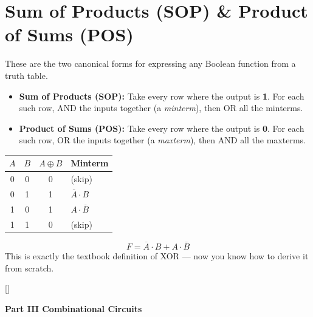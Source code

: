 \documentclass[11pt, letterpaper]{article}
\newcommand{\tealsections}{%
  \titleformat{\section}{\large\bfseries\color{sectionteal}}{}{0em}{}[\color{sectionteal}\titlerule]%
  \titleformat{\subsection}{\normalsize\bfseries\color{sectionteal!80!black}}{}{0em}{}%
}
\newcommand{\partbanner}[3]{%
  \begin{tcolorbox}[colback=#1, colframe=#2, boxrule=1.2pt, arc=4pt,
    left=8pt, right=8pt, top=6pt, bottom=6pt]
    \begin{center}{\LARGE\bfseries #3}\end{center}
  \end{tcolorbox}%
}
\begin{document}
\section*{Sum of Products (SOP) \& Product of Sums (POS)}

These are the two canonical forms for expressing any Boolean function from a truth table.

\begin{itemize}[noitemsep]
  \item \textbf{Sum of Products (SOP):} Take every row where the output is \textbf{1}. For each such row, AND the inputs together (a \emph{minterm}), then OR all the minterms.
  \item \textbf{Product of Sums (POS):} Take every row where the output is \textbf{0}. For each such row, OR the inputs together (a \emph{maxterm}), then AND all the maxterms.
\end{itemize}

\begin{tcolorbox}[colback=part4bg, colframe=sectionorange,
  title={\bfseries Example: Build an SOP expression for XOR from a truth table}, arc=3pt, boxrule=1pt]
\begin{center}
\renewcommand{\arraystretch}{1.3}
\begin{tabular}{cc|c|l}
$A$ & $B$ & $A \oplus B$ & Minterm \\
\hline
0 & 0 & 0 & (skip) \\
0 & 1 & 1 & $\overline{A}\cdot B$ \\
1 & 0 & 1 & $A\cdot\overline{B}$ \\
1 & 1 & 0 & (skip) \\
\end{tabular}
\end{center}
\[
  F = \overline{A}\cdot B + A\cdot\overline{B}
\]
This is exactly the textbook definition of XOR --- now you know how to derive it from scratch.
\end{tcolorbox}

\newpage

\tealsections
{}
\partbanner{part5bg}{sectionteal}{Part III \quad Combinational Circuits}
\end{document}

